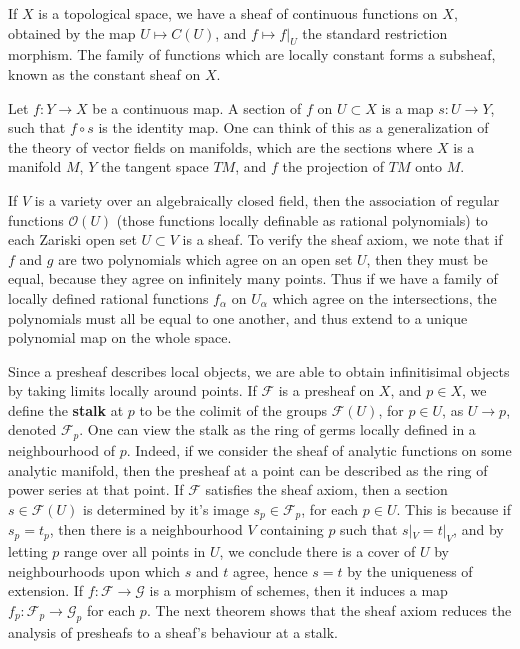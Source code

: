 \begin{example}
    If $X$ is a topological space, we have a sheaf of continuous functions on $X$, obtained by the map $U \mapsto C(U)$, and $f \mapsto f|_U$ the standard restriction morphism. The family of functions which are locally constant forms a subsheaf, known as the constant sheaf on $X$.
\end{example}

\begin{example}
    Let $f: Y \to X$ be a continuous map. A section of $f$ on $U \subset X$ is a map $s: U \to Y$, such that $f \circ s$ is the identity map. One can think of this as a generalization of the theory of vector fields on manifolds, which are the sections where $X$ is a manifold $M$, $Y$ the tangent space $TM$, and $f$ the projection of $TM$ onto $M$.
\end{example}

\begin{example}
    If $V$ is a variety over an algebraically closed field, then the association of regular functions $\mathcal{O}(U)$ (those functions locally definable as rational polynomials) to each Zariski open set $U \subset V$ is a sheaf. To verify the sheaf axiom, we note that if $f$ and $g$ are two polynomials which agree on an open set $U$, then they must be equal, because they agree on infinitely many points. Thus if we have a family of locally defined rational functions $f_\alpha$ on $U_\alpha$ which agree on the intersections, the polynomials must all be equal to one another, and thus extend to a unique polynomial map on the whole space.
\end{example}

Since a presheaf describes local objects, we are able to obtain infinitisimal objects by taking limits locally around points. If $\mathcal{F}$ is a presheaf on $X$, and $p \in X$, we define the {\bf stalk} at $p$ to be the colimit of the groups $\mathcal{F}(U)$, for $p \in U$, as $U \to p$, denoted $\mathcal{F}_p$. One can view the stalk as the ring of germs locally defined in a neighbourhood of $p$. Indeed, if we consider the sheaf of analytic functions on some analytic manifold, then the presheaf at a point can be described as the ring of power series at that point. If $\mathcal{F}$ satisfies the sheaf axiom, then a section $s \in \mathcal{F}(U)$ is determined by it's image $s_p \in \mathcal{F}_p$, for each $p \in U$. This is because if $s_p = t_p$, then there is a neighbourhood $V$ containing $p$ such that $s|_V = t|_V$, and by letting $p$ range over all points in $U$, we conclude there is a cover of $U$ by neighbourhoods upon which $s$ and $t$ agree, hence $s = t$ by the uniqueness of extension. If $f: \mathcal{F} \to \mathcal{G}$ is a morphism of schemes, then it induces a map $f_p: \mathcal{F}_p \to \mathcal{G}_p$ for each $p$. The next theorem shows that the sheaf axiom reduces the analysis of presheafs to a sheaf's behaviour at a stalk.

